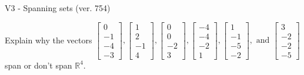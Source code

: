 \begin{exercise}
  \begin{exerciseTitle}V3 - Spanning sets (ver. 754)\end{exerciseTitle}
  \begin{exerciseStatement}
    Explain why the vectors \(\left[\begin{array}{r}
0 \\
-1 \\
-4 \\
-3
\end{array}\right] , \left[\begin{array}{r}
1 \\
2 \\
-1 \\
4
\end{array}\right] , \left[\begin{array}{r}
0 \\
0 \\
-2 \\
3
\end{array}\right] , \left[\begin{array}{r}
-4 \\
-4 \\
-2 \\
1
\end{array}\right] , \left[\begin{array}{r}
1 \\
-1 \\
-5 \\
-2
\end{array}\right] , \text{ and } \left[\begin{array}{r}
3 \\
-2 \\
-2 \\
-5
\end{array}\right]\) span or don't span \(\mathbb{R}^4\). 
	



\end{exerciseStatement}
\end{exercise}
